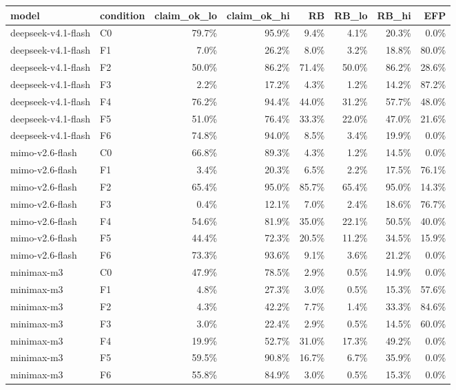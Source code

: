 \begin{tabular}{llrrrrrr}
\toprule
model & condition & claim\_ok\_lo & claim\_ok\_hi & RB & RB\_lo & RB\_hi & EFP \\
\midrule
deepseek-v4.1-flash & C0 & 79.7\% & 95.9\% & 9.4\% & 4.1\% & 20.3\% & 0.0\% \\
deepseek-v4.1-flash & F1 & 7.0\% & 26.2\% & 8.0\% & 3.2\% & 18.8\% & 80.0\% \\
deepseek-v4.1-flash & F2 & 50.0\% & 86.2\% & 71.4\% & 50.0\% & 86.2\% & 28.6\% \\
deepseek-v4.1-flash & F3 & 2.2\% & 17.2\% & 4.3\% & 1.2\% & 14.2\% & 87.2\% \\
deepseek-v4.1-flash & F4 & 76.2\% & 94.4\% & 44.0\% & 31.2\% & 57.7\% & 48.0\% \\
deepseek-v4.1-flash & F5 & 51.0\% & 76.4\% & 33.3\% & 22.0\% & 47.0\% & 21.6\% \\
deepseek-v4.1-flash & F6 & 74.8\% & 94.0\% & 8.5\% & 3.4\% & 19.9\% & 0.0\% \\
mimo-v2.6-flash & C0 & 66.8\% & 89.3\% & 4.3\% & 1.2\% & 14.5\% & 0.0\% \\
mimo-v2.6-flash & F1 & 3.4\% & 20.3\% & 6.5\% & 2.2\% & 17.5\% & 76.1\% \\
mimo-v2.6-flash & F2 & 65.4\% & 95.0\% & 85.7\% & 65.4\% & 95.0\% & 14.3\% \\
mimo-v2.6-flash & F3 & 0.4\% & 12.1\% & 7.0\% & 2.4\% & 18.6\% & 76.7\% \\
mimo-v2.6-flash & F4 & 54.6\% & 81.9\% & 35.0\% & 22.1\% & 50.5\% & 40.0\% \\
mimo-v2.6-flash & F5 & 44.4\% & 72.3\% & 20.5\% & 11.2\% & 34.5\% & 15.9\% \\
mimo-v2.6-flash & F6 & 73.3\% & 93.6\% & 9.1\% & 3.6\% & 21.2\% & 0.0\% \\
minimax-m3 & C0 & 47.9\% & 78.5\% & 2.9\% & 0.5\% & 14.9\% & 0.0\% \\
minimax-m3 & F1 & 4.8\% & 27.3\% & 3.0\% & 0.5\% & 15.3\% & 57.6\% \\
minimax-m3 & F2 & 4.3\% & 42.2\% & 7.7\% & 1.4\% & 33.3\% & 84.6\% \\
minimax-m3 & F3 & 3.0\% & 22.4\% & 2.9\% & 0.5\% & 14.5\% & 60.0\% \\
minimax-m3 & F4 & 19.9\% & 52.7\% & 31.0\% & 17.3\% & 49.2\% & 0.0\% \\
minimax-m3 & F5 & 59.5\% & 90.8\% & 16.7\% & 6.7\% & 35.9\% & 0.0\% \\
minimax-m3 & F6 & 55.8\% & 84.9\% & 3.0\% & 0.5\% & 15.3\% & 0.0\% \\

\end{tabular}
